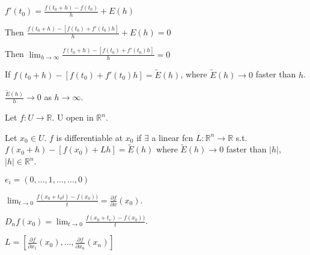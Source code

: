 \documentclass[twoside]{article}
\newcommand\R{\mathbb{R}}
\begin{document}
    $f'(t_0) = \frac{f(t_0 + h) - f(t_0)}{h} + E(h)$

    Then $\frac{f(t_0 + h) - [f(t_0) + f'(t_0)h]}{h} + E(h) = 0$

    Then $\lim_{h\rightarrow \infty} \frac{f(t_0 + h) - [f(t_0) + f'(t_0)h]}{h} = 0$

    If $f(t_0 + h) - [f(t_0) + f'(t_0)h] = \tilde E(h)$, where $\tilde E(h) \rightarrow 0$ faster than $h$. 

    $\frac{\tilde E(h)}{h}\rightarrow 0$ as $h \rightarrow \infty$. 

    Let $f: U \rightarrow \R$. U open in $\R^n$. 

    Let $x_0 \in U$. $f$ is differentiable at $x_0$ if $\exists$ a linear fcn $L: \R^n \rightarrow \R$ s.t. $f(x_0 + h) - [f(x_0) + Lh] = \tilde E(h)$ where $\tilde E(h) \rightarrow 0$ faster than $|h|$, $|h| \in \R^n$. 

    $e_i = (0,\dots,1,\dots, \dots,0)$

    $\lim_{t \rightarrow 0}\frac{f(x_0+t_0i) - f(x_0))}{t} = \frac{\partial f}{\partial x}(x_0)$. 

    $D_nf(x_0) = \lim_{t \rightarrow 0}\frac{f(x_0+t_v) - f(x_0))}{t}$.

    $L = [\frac{\partial f}{\partial x_1}(x_0), \dots, \frac{\partial f}{\partial x_n}(x_n)]$
\end{document}
